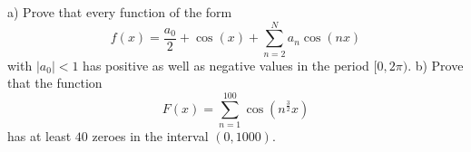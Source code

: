 a) Prove that every function of the form
$$f(x)=\frac{a_{0}}{2}+\cos(x)+\sum_{n=2}^{N}a_{n}\cos(nx)$$with $|a_{0}|<1$ has positive as well as negative values in the period $[0,2\pi)$.
b) Prove that the function
$$F(x)=\sum_{n=1}^{100}\cos(n^{\frac{3}{2}}x)$$has at least $40$ zeroes in the interval $(0,1000)$.